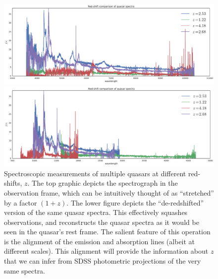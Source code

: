 \documentclass{article}
\begin{document}
\begin{figure}[ht]
\vskip 0.2in
\begin{center}
\centerline{\includegraphics[width=2\columnwidth]{../figs/quasar_redshift_obs_frame}}
\centerline{\includegraphics[width=2\columnwidth]{../figs/quasar_redshift_rest_frame}}
\caption{Spectroscopic measurements of multiple quasars at different red-shifts, $z$.  The top graphic depicts the spectrograph in the observation frame, which can be intuitively thought of as ``stretched'' by a factor $(1+z)$.  The lower figure depicts the ``de-redshifted'' version of the same quasar spectra.  This effectively squashes observations, and reconstructs the quasar spectra as it would be seen in the quasar's rest frame.  The salient feature of this operation is the alignment of the emission and absorption lines (albeit at different scales).  This alignment will provide the information about $z$ that we can infer from SDSS photometric projections of the very same spectra.}
\label{fig:frames}
\end{center}
\vskip -0.2in
\end{figure} 
\end{document}
